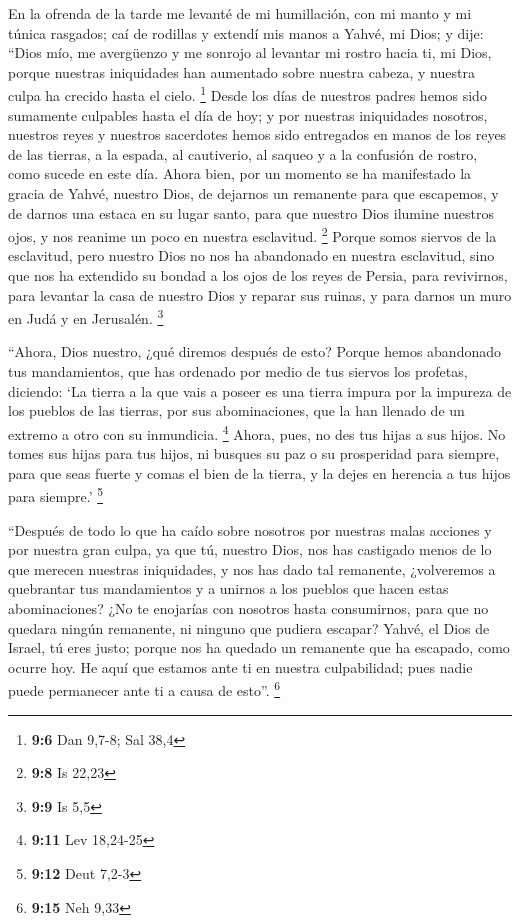 En la ofrenda de la tarde me levanté de mi humillación,
con mi manto y mi túnica rasgados; caí de rodillas y extendí mis manos a
Yahvé, mi Dios;  y dije: ``Dios mío, me avergüenzo y me
sonrojo al levantar mi rostro hacia ti, mi Dios, porque nuestras
iniquidades han aumentado sobre nuestra cabeza, y nuestra culpa ha
crecido hasta el cielo. \footnote{\textbf{9:6} Dan 9,7-8; Sal 38,4}
 Desde los días de nuestros padres hemos sido sumamente
culpables hasta el día de hoy; y por nuestras iniquidades nosotros,
nuestros reyes y nuestros sacerdotes hemos sido entregados en manos de
los reyes de las tierras, a la espada, al cautiverio, al saqueo y a la
confusión de rostro, como sucede en este día.  Ahora bien,
por un momento se ha manifestado la gracia de Yahvé, nuestro Dios, de
dejarnos un remanente para que escapemos, y de darnos una estaca en su
lugar santo, para que nuestro Dios ilumine nuestros ojos, y nos reanime
un poco en nuestra esclavitud. \footnote{\textbf{9:8} Is 22,23}
 Porque somos siervos de la esclavitud, pero nuestro Dios
no nos ha abandonado en nuestra esclavitud, sino que nos ha extendido su
bondad a los ojos de los reyes de Persia, para revivirnos, para levantar
la casa de nuestro Dios y reparar sus ruinas, y para darnos un muro en
Judá y en Jerusalén. \footnote{\textbf{9:9} Is 5,5}

 ``Ahora, Dios nuestro, ¿qué diremos después de esto?
Porque hemos abandonado tus mandamientos,  que has
ordenado por medio de tus siervos los profetas, diciendo: `La tierra a
la que vais a poseer es una tierra impura por la impureza de los pueblos
de las tierras, por sus abominaciones, que la han llenado de un extremo
a otro con su inmundicia. \footnote{\textbf{9:11} Lev 18,24-25}
 Ahora, pues, no des tus hijas a sus hijos. No tomes sus
hijas para tus hijos, ni busques su paz o su prosperidad para siempre,
para que seas fuerte y comas el bien de la tierra, y la dejes en
herencia a tus hijos para siempre.' \footnote{\textbf{9:12} Deut 7,2-3}

 ``Después de todo lo que ha caído sobre nosotros por
nuestras malas acciones y por nuestra gran culpa, ya que tú, nuestro
Dios, nos has castigado menos de lo que merecen nuestras iniquidades, y
nos has dado tal remanente,  ¿volveremos a quebrantar tus
mandamientos y a unirnos a los pueblos que hacen estas abominaciones?
¿No te enojarías con nosotros hasta consumirnos, para que no quedara
ningún remanente, ni ninguno que pudiera escapar?  Yahvé,
el Dios de Israel, tú eres justo; porque nos ha quedado un remanente que
ha escapado, como ocurre hoy. He aquí que estamos ante ti en nuestra
culpabilidad; pues nadie puede permanecer ante ti a causa de esto''.
\footnote{\textbf{9:15} Neh 9,33}

